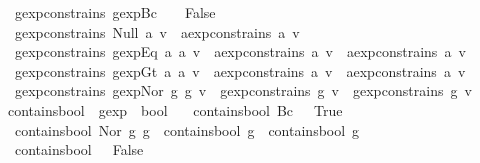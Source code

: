 \begin{isabellebody}
\ \ {\isachardoublequoteopen}gexp{\isacharunderscore}constrains\ {\isacharparenleft}gexp{\isachardot}Bc\ {\isacharunderscore}{\isacharparenright}\ {\isacharunderscore}\ {\isacharequal}\ False{\isachardoublequoteclose}\ {\isacharbar}\isanewline
\ \ {\isachardoublequoteopen}gexp{\isacharunderscore}constrains\ {\isacharparenleft}Null\ a{\isacharparenright}\ v\ {\isacharequal}\ aexp{\isacharunderscore}constrains\ a\ v{\isachardoublequoteclose}\ {\isacharbar}\isanewline
\ \ {\isachardoublequoteopen}gexp{\isacharunderscore}constrains\ {\isacharparenleft}gexp{\isachardot}Eq\ a{}\ a{}{\isacharparenright}\ v\ {\isacharequal}\ {\isacharparenleft}aexp{\isacharunderscore}constrains\ a{}\ v\ {\isasymor}\ aexp{\isacharunderscore}constrains\ a{}\ v{\isacharparenright}{\isachardoublequoteclose}\ {\isacharbar}\isanewline
\ \ {\isachardoublequoteopen}gexp{\isacharunderscore}constrains\ {\isacharparenleft}gexp{\isachardot}Gt\ a{}\ a{}{\isacharparenright}\ v\ {\isacharequal}\ {\isacharparenleft}aexp{\isacharunderscore}constrains\ a{}\ v\ {\isasymor}\ aexp{\isacharunderscore}constrains\ a{}\ v{\isacharparenright}{\isachardoublequoteclose}\ {\isacharbar}\isanewline
\ \ {\isachardoublequoteopen}gexp{\isacharunderscore}constrains\ {\isacharparenleft}gexp{\isachardot}Nor\ g{}\ g{}{\isacharparenright}\ v\ {\isacharequal}\ {\isacharparenleft}gexp{\isacharunderscore}constrains\ g{}\ v\ {\isasymor}\ gexp{\isacharunderscore}constrains\ g{}\ v{\isacharparenright}{\isachardoublequoteclose}\isanewline
\isanewline
{}\isamarkupfalse%
\ contains{\isacharunderscore}bool\ {\isacharcolon}{\isacharcolon}\ {\isachardoublequoteopen}gexp\ {\isasymRightarrow}\ bool{\isachardoublequoteclose}\ \isanewline
\ \ {\isachardoublequoteopen}contains{\isacharunderscore}bool\ {\isacharparenleft}Bc\ {\isacharunderscore}{\isacharparenright}\ {\isacharequal}\ True{\isachardoublequoteclose}\ {\isacharbar}\isanewline
\ \ {\isachardoublequoteopen}contains{\isacharunderscore}bool\ {\isacharparenleft}Nor\ g{}\ g{}{\isacharparenright}\ {\isacharequal}\ {\isacharparenleft}contains{\isacharunderscore}bool\ g{}\ {\isasymor}\ contains{\isacharunderscore}bool\ g{}{\isacharparenright}{\isachardoublequoteclose}\ {\isacharbar}\isanewline
\ \ {\isachardoublequoteopen}contains{\isacharunderscore}bool\ {\isacharunderscore}\ {\isacharequal}\ False{\isachardoublequoteclose}\isanewline
\isanewline
{}\isamarkupfalse%

\end{isabellebody}
